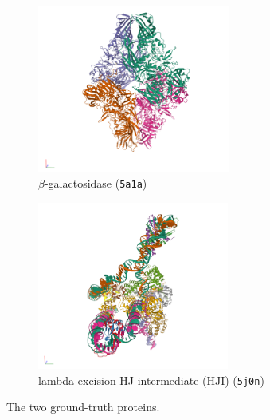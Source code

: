 \begin{figure}[ht!]
    \centering
    \begin{subfigure}[t]{0.45\linewidth}
        \centering
        \includegraphics[height=5.5cm]{figures/5a1a_pdb.png}
        \caption{$\beta$-galactosidase (\texttt{5a1a})~\cite{5a1a_pdb}}
    \end{subfigure}
    \begin{subfigure}[t]{0.45\linewidth}
        \centering
        \includegraphics[height=5.5cm]{figures/5j0n_pdb.png}
        \caption{lambda excision HJ intermediate (HJI) (\texttt{5j0n})~\cite{5j0n_pdb}}
    \end{subfigure}
    \caption{%
        The two ground-truth proteins.
    }\label{fig:pdb-proteins}
\end{figure}

